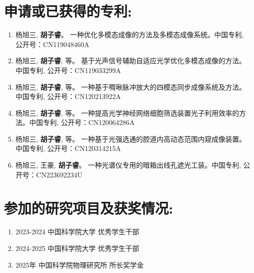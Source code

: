 \section*{申请或已获得的专利:}
\begin{enumerate}[nosep]
    \item 杨旭三, \textbf{胡子睿}。 一种优化多模态成像的方法及多模态成像系统。中国专利, 公开号：CN119048460A
    \item 杨旭三, \textbf{胡子睿}, 等。 基于光声信号辅助自适应光学优化多模态成像的方法。中国专利, 公开号：CN119033299A
    \item 杨旭三, \textbf{胡子睿}, 等。 一种基于啁啾脉冲放大的四模态同步成像系统及方法。中国专利, 公开号：CN120213922A
    \item 杨旭三, \textbf{胡子睿}, 等。 一种提高光学神经网络细胞筛选装置光子利用效率的方法。中国专利, 公开号：CN120064286A
    \item 杨旭三, \textbf{胡子睿}, 等。 一种基于光强选通的腔道内高动态范围内窥成像装置。中国专利, 公开号：CN120314215A
    \item 杨旭三, 王豪, \textbf{胡子睿}。 一种光谱仪专用的暗箱出线孔遮光工装。中国专利, 公开号：CN223692234U
\end{enumerate}

\section*{参加的研究项目及获奖情况:}
\begin{enumerate}[nosep]
    \item 2023-2024 中国科学院大学 优秀学生干部
    \item 2024-2025 中国科学院大学 优秀学生干部
    \item 2025年 中国科学院物理研究所 所长奖学金
\end{enumerate}


\cleardoublepage[plain]%
